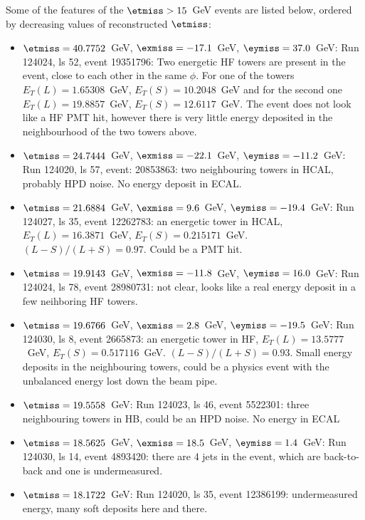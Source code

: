 Some of the features of the $\etmiss>15$~GeV events are listed below,
ordered by decreasing values of reconstructed $\etmiss$:
\begin{itemize}
\item $\etmiss=40.7752$~GeV, $\exmiss=-17.1$~GeV, $\eymiss=37.0$~GeV:
  Run 124024, ls 52, event 19351796: Two energetic HF towers are present
  in the event, close to each other in the same $\phi$. For one of the
  towers $E_{T}(L)=1.65308$~GeV, $E_{T}(S)=10.2048$~GeV and for the
  second one $E_{T}(L)=19.8857$~GeV, $E_{T}(S)=12.6117$~GeV. The event
  does not look like a HF PMT hit, however there is very little energy
  deposited in the neighbourhood of the two towers above.

\item $\etmiss=24.7444$~GeV, $\exmiss=-22.1$~GeV, $\eymiss=-11.2$~GeV:
  Run 124020, ls 57, event: 20853863: two neighbouring towers in HCAL,
  probably HPD noise. No energy deposit in ECAL.

\item $\etmiss=21.6884$~GeV, $\exmiss=9.6$~GeV, $\eymiss=-19.4$~GeV: Run
  124027, ls 35, event 12262783: an energetic tower in HCAL,
  $E_{T}(L)=16.3871$~GeV,
  $E_{T}(S)=0.215171$~GeV. $(L-S)/(L+S)=0.97$. Could be a PMT hit.

\item $\etmiss=19.9143$~GeV, $\exmiss=-11.8$~GeV, $\eymiss=16.0$~GeV:
  Run 124024, ls 78, event 28980731: not clear, looks like a real energy
  deposit in a few neihboring HF towers.

\item $\etmiss=19.6766$~GeV, $\exmiss=2.8$~GeV, $\eymiss=-19.5$~GeV: Run
  124030, ls 8, event 2665873: an energetic tower in HF, $E_{T}(L)=
  13.5777$~GeV, $E_{T}(S)=0.517116$~GeV. $(L-S)/(L+S)=0.93$. Small
  energy deposits in the neighbouring towers, could be a physics event
  with the unbalanced energy lost down the beam pipe.

\item $\etmiss=19.5558 $~GeV: Run 124023, ls 46, event 5522301: three
  neighbouring towers in HB, could be an HPD noise. No energy in ECAL

\item $\etmiss=18.5625$~GeV, $\exmiss=18.5$~GeV, $\eymiss=1.4$~GeV: Run
  124030, ls 14, event 4893420: there are 4 jets in the event, which are
  back-to-back and one is undermeasured.

\item $\etmiss=18.1722$~GeV: Run 124020, ls 35, event 12386199:
  undermeasured energy, many soft deposits here and there.


\end{itemize}
